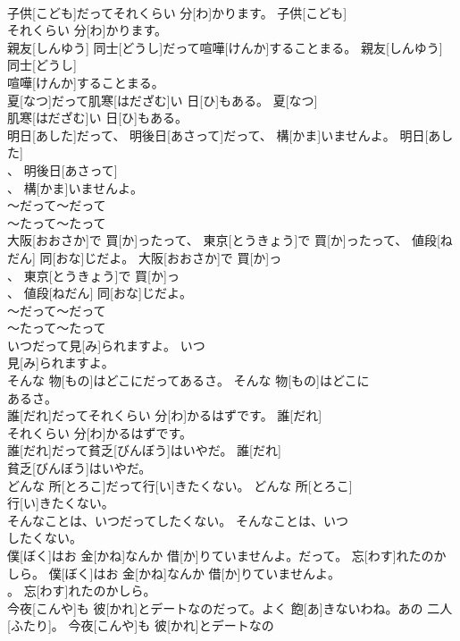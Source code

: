\documentclass[8pt]{extreport}
\begin{document}
\begin{CJK}{UTF8}{min}
\\	子供[こども]だってそれくらい 分[わ]かります。	子供[こども]
\\	それくらい 分[わ]かります。	
\\	親友[しんゆう] 同士[どうし]だって喧嘩[けんか]することまる。	親友[しんゆう] 同士[どうし]
\\	喧嘩[けんか]することまる。	
\\	夏[なつ]だって肌寒[はだざむ]い 日[ひ]もある。	夏[なつ]
\\	肌寒[はだざむ]い 日[ひ]もある。	
\\	明日[あした]だって、 明後日[あさって]だって、 構[かま]いませんよ。	明日[あした]
\\	、 明後日[あさって]
\\	、 構[かま]いませんよ。	
\\	～だって～だって 
\\	～たって～たって 
\\	大阪[おおさか]で 買[か]ったって、 東京[とうきょう]で 買[か]ったって、 値段[ねだん] 同[おな]じだよ。	大阪[おおさか]で 買[か]っ
\\	、 東京[とうきょう]で 買[か]っ
\\	、 値段[ねだん] 同[おな]じだよ。	
\\	～だって～だって 
\\	～たって～たって 
\\	いつだって見[み]られますよ。	いつ
\\	見[み]られますよ。	
\\	そんな 物[もの]はどこにだってあるさ。	そんな 物[もの]はどこに
\\	あるさ。	
\\	誰[だれ]だってそれくらい 分[わ]かるはずです。	誰[だれ]
\\	それくらい 分[わ]かるはずです。	
\\	誰[だれ]だって貧乏[びんぼう]はいやだ。	誰[だれ]
\\	貧乏[びんぼう]はいやだ。	
\\	どんな 所[とろこ]だって行[い]きたくない。	どんな 所[とろこ]
\\	行[い]きたくない。	
\\	そんなことは、いつだってしたくない。	そんなことは、いつ
\\	したくない。	
\\	僕[ぼく]はお 金[かね]なんか 借[か]りていませんよ。だって。 忘[わす]れたのかしら。	僕[ぼく]はお 金[かね]なんか 借[か]りていませんよ。
\\	。 忘[わす]れたのかしら。	
\\	今夜[こんや]も 彼[かれ]とデートなのだって。よく 飽[あ]きないわね。あの 二人[ふたり]。	今夜[こんや]も 彼[かれ]とデートなの

\end{CJK}
\end{document}
